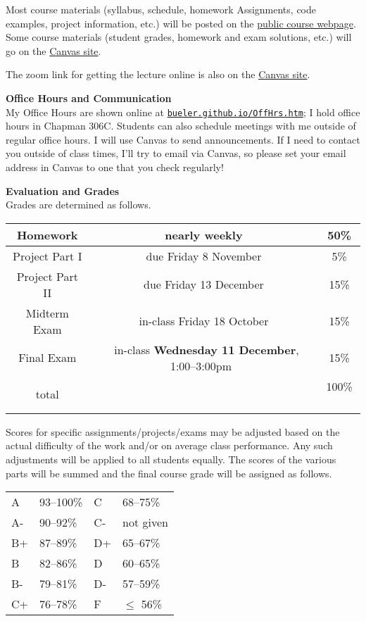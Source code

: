 \documentclass[12pt]{article}
\renewcommand{\emph}[1]{\textsf{\textbf{#1}}}
\newcommand{\localhead}[1]{\par\smallskip\textbf{#1} \smallskip\nobreak\\}%
\def\heading#1{\localhead{\large\emph{#1}}}
\begin{document}
Most course materials (syllabus, schedule, homework Assignments, code examples, project information, etc.) will be posted on the \href{https://bueler.github.io/opt/}{public course webpage}.  Some course materials (student grades, homework and exam solutions, etc.) will go on the \href{https://canvas.alaska.edu/courses/21663}{Canvas site}.

The zoom link for getting the lecture online is also on the \href{https://canvas.alaska.edu/courses/21663}{Canvas site}.

\heading{Office Hours and Communication}
My Office Hours are shown online at \href{http://bueler.github.io/OffHrs.htm}{\texttt{bueler.github.io/OffHrs.htm}}; I hold office hours in Chapman 306C.  Students can also schedule meetings with me outside of regular office hours.  I will use Canvas to send announcements.  If I need to contact you outside of class times, I'll try to email via Canvas, so please set your email address in Canvas to one that you check regularly!


\heading{Evaluation and Grades}
Grades are determined as follows.

\begin{tabular}{|c|c|c|}
\hline
Homework & nearly weekly & 50\% \\
\hline
Project Part I & due Friday 8 November & 5\%  \\
\hline
Project Part II & due Friday 13 December & 15\%  \\
\hline
Midterm Exam & in-class Friday 18 October & 15\%  \\
\hline
Final Exam & \, in-class \emph{Wednesday 11 December}, 1:00--3:00pm \, & 15\% \\
\hline
total & & 100\% \, \\
\hline
\end{tabular}

Scores for specific assignments/projects/exams may be adjusted based on the actual difficulty of the work and/or on average class performance.  Any such adjustments will be applied to all students equally.  The scores of the various parts will be summed and the final course grade will be assigned as follows.

\begin{tabular}{llll}
A  & 93--100\%& C  & 68--75\%  \\
A- & 90--92\% & C- & not given \\
B+ & 87--89\% & D+ & 65--67\%  \\
B  & 82--86\% & D  & 60--65\%  \\
B- & 79--81\% & D- & 57--59\%  \\
C+ & 76--78\% & F  & $\le$ 56\%
\end{tabular}
\end{document}
